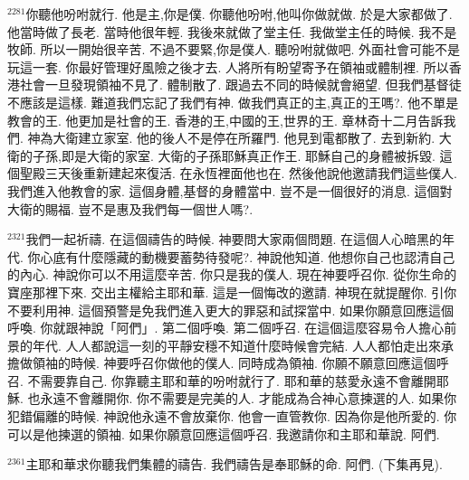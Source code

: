 \documentclass{book}
\begin{document}
$^{2281}$你聽他吩咐就行.
他是主,你是僕.
你聽他吩咐,他叫你做就做.
於是大家都做了.
他當時做了長老.
當時他很年輕.
我後來就做了堂主任.
我做堂主任的時候.
我不是牧師.
所以一開始很辛苦.
不過不要緊,你是僕人.
聽吩咐就做吧.
外面社會可能不是玩這一套.
你最好管理好風險之後才去.
人將所有盼望寄予在領袖或體制裡.
所以香港社會一旦發現領袖不見了.
體制散了.
跟過去不同的時候就會絕望.
但我們基督徒不應該是這樣.
難道我們忘記了我們有神.
做我們真正的主,真正的王嗎?.
他不單是教會的王.
他更加是社會的王.
香港的王,中國的王,世界的王.
章林奇十二月告訴我們.
神為大衛建立家室.
他的後人不是停在所羅門.
他見到電都散了.
去到新約.
大衛的子孫,即是大衛的家室.
大衛的子孫耶穌真正作王.
耶穌自己的身體被拆毀.
這個聖殿三天後重新建起來復活.
在永恆裡面他也在.
然後他說他邀請我們這些僕人.
我們進入他教會的家.
這個身體,基督的身體當中.
豈不是一個很好的消息.
這個對大衛的賜福.
豈不是惠及我們每一個世人嗎?.

$^{2321}$我們一起祈禱.
在這個禱告的時候.
神要問大家兩個問題.
在這個人心暗黑的年代.
你心底有什麼隱藏的動機要蓄勢待發呢?.
神說他知道.
他想你自己也認清自己的內心.
神說你可以不用這麼辛苦.
你只是我的僕人.
現在神要呼召你.
從你生命的寶座那裡下來.
交出主權給主耶和華.
這是一個悔改的邀請.
神現在就提醒你.
引你不要利用神.
這個預警是免我們進入更大的罪惡和試探當中.
如果你願意回應這個呼喚.
你就跟神說「阿們」.
第二個呼喚.
第二個呼召.
在這個這麼容易令人擔心前景的年代.
人人都說這一刻的平靜安穩不知道什麼時候會完結.
人人都怕走出來承擔做領袖的時候.
神要呼召你做他的僕人.
同時成為領袖.
你願不願意回應這個呼召.
不需要靠自己.
你靠聽主耶和華的吩咐就行了.
耶和華的慈愛永遠不會離開耶穌.
也永遠不會離開你.
你不需要是完美的人.
才能成為合神心意揀選的人.
如果你犯錯偏離的時候.
神說他永遠不會放棄你.
他會一直管教你.
因為你是他所愛的.
你可以是他揀選的領袖.
如果你願意回應這個呼召.
我邀請你和主耶和華說.
阿們.

$^{2361}$主耶和華求你聽我們集體的禱告.
我們禱告是奉耶穌的命.
阿們.
(下集再見).
\newpage
\end{document}
